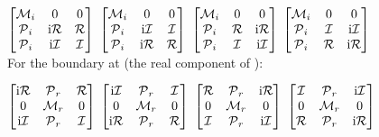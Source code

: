 \documentclass[preprint]{iucr}              %
\numberwithin{equation}{section}
\newcommand{\Imaginary}[0]{\mathcal{I}}
\newcommand{\Real}[0]{\mathcal{R}}
\begin{document}
	$\begin{bmatrix}
		\Minus{}_i	& 0					& 0 \\
		\Plus{}_i	&  \textrm{i}\Real{}	& \Real{} \\
		\Plus{}_i	& \textrm{i}\Imaginary{}	& \Imaginary{}
	\end{bmatrix}$
	$\begin{bmatrix}
		\Minus{}_i	& 0					& 0 \\
		\Plus{}_i	& \textrm{i}\Imaginary{}	& \Imaginary{} \\
		\Plus{}_i	&  \textrm{i}\Real{}	& \Real{} \\
	\end{bmatrix}$ 
	$\begin{bmatrix}
		\Minus{}_i	& 0			& 0 \\
		\Plus{}_i	&  \Real{}	& \textrm{i}\Real{} \\
		\Plus{}_i	& \Imaginary{}		& \textrm{i}\Imaginary{}
	\end{bmatrix}	$
	$\begin{bmatrix}
		\Minus{}_i	& 0		& 0 \\
		\Plus{}_i	& \Imaginary{}	& \textrm{i}\Imaginary{} \\
		\Plus{}_i	&  \Real{}& \textrm{i}\Real{} \\
	\end{bmatrix}$ \\
	
	For the boundary at \sii{} (the real component of \cii{}):
	
	$\begin{bmatrix}
		
		\textrm{i}\Real{}	& \Plus{}_r		& \Real{} \\
		0				& \Minus{}_r	& 0 \\
		\textrm{i}\Imaginary{}	& \Plus{}_r		& \Imaginary{}
	\end{bmatrix}$
	$\begin{bmatrix}
		\textrm{i}\Imaginary{}	& \Plus{}_r		&  \Imaginary{} \\
		0				& \Minus{}_r	& 0 \\
		\textrm{i}\Real{}	& \Plus{}_r		& \Real{} \\
	\end{bmatrix}$
	$\begin{bmatrix}
		\Real{}	&\Plus{}_r		&   \textrm{i}\Real{} \\
		0		& \Minus{}_r	&  0 \\
		\Imaginary{}	&\Plus{}_r		& \textrm{i}\Imaginary{}
	\end{bmatrix}	$ 
	$\begin{bmatrix}
		\Imaginary{}	& \Plus{}_r	& \textrm{i}\Imaginary{} \\
		0		&\Minus{}_r	&  0 \\
		\Real{}	& \Plus{}_r	&  \textrm{i}\Real{} \\
	\end{bmatrix}$ \\
	
\end{document}
